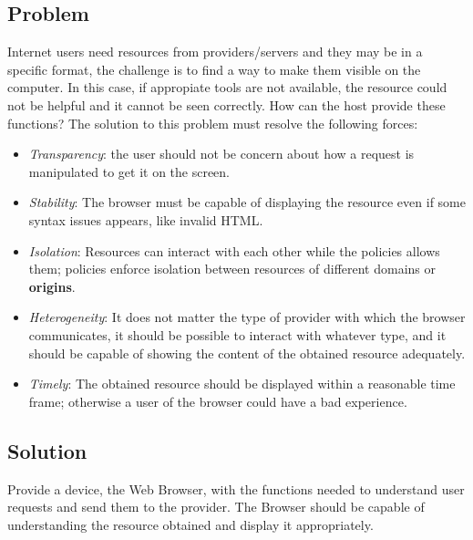 \documentclass{sig-alternate-05-2015}
\begin{document}
  \subsection*{Problem}
  Internet users need resources from providers/servers and they may be in a specific format, the challenge is to find a way to make them visible on the computer. In this case, if appropiate tools are not available, the resource could not be helpful and it cannot be seen correctly. How can the host provide these functions? The solution to this problem must resolve the following forces:
  \begin{itemize}
    \item \textit{Transparency}: the user should not be concern about how a request is manipulated to get it on the screen.
    \item \textit{Stability}: The browser must be capable of displaying the resource even if some syntax issues appears, like invalid HTML.
    \item \textit{Isolation}: Resources can interact with each other while the policies allows them; policies enforce isolation between resources of different domains or \textbf{origins}.
    \item \textit{Heterogeneity}: It does not matter the type of provider with which the browser communicates, it should be possible to interact with whatever type, and it should be capable of showing the content of the obtained resource adequately.
    \item \textit{Timely}: The obtained resource should be displayed within a reasonable time frame; otherwise a user of the browser could have a bad experience.
  \end{itemize}

  \subsection*{Solution}
  Provide a device, the Web Browser, with the functions needed to understand user requests and send them to the provider. The Browser should be capable of understanding the resource obtained and display it appropriately. 
\end{document}
